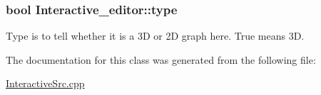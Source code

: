 \subsubsection[{\texorpdfstring{type}{type}}]{\setlength{\rightskip}{0pt plus 5cm}bool Interactive\+\_\+editor\+::type}\hypertarget{classInteractive__editor_a93c2f2041e432c8047d51942345cc3f9}{}\label{classInteractive__editor_a93c2f2041e432c8047d51942345cc3f9}
Type is to tell whether it is a 3D or 2D graph here. True means 3D. 

The documentation for this class was generated from the following file\+:\begin{DoxyCompactItemize}
\item 
\hyperlink{InteractiveSrc_8cpp}{Interactive\+Src.\+cpp}\end{DoxyCompactItemize}
